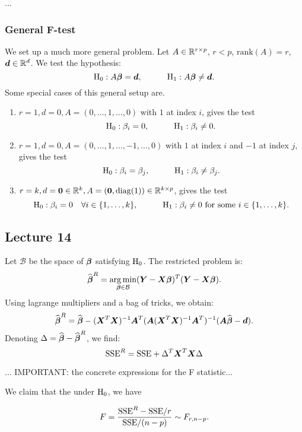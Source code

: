 


... \TODO

\subsubsection*{General F-test}


We set up a much more general problem. Let $A\in\mathbb{R}^{r\times p}$, $r<p$, $\mathrm{rank}(A)=r$, $\boldsymbol{d}\in\mathbb{R}^d$. We test the hypothesis:
$$
    \mathrm{H}_0 : A\boldsymbol{\beta} = \boldsymbol{d}, 
    \quad\quad\quad
    \mathrm{H}_1 : A\boldsymbol{\beta} \ne \boldsymbol{d}.
$$
Some special cases of this general setup are.
\begin{enumerate}
    \item $r=1, d=0, A=(0, \dots, 1, \dots, 0)$ with $1$ at index $i$, gives the test 
    $$
        \mathrm{H}_0 : \beta_i = 0, 
        \quad\quad\quad
        \mathrm{H}_1 : \beta_i \ne 0.
    $$
    \item $r=1, d=0, A=(0, \dots, 1, \dots, -1, \dots, 0)$ with $1$ at index $i$ and $-1$ at index $j$, gives the test 
    $$
        \mathrm{H}_0 : \beta_i = \beta_j,
        \quad\quad\quad
        \mathrm{H}_1 : \beta_i \ne \beta_j.
    $$
    \item $r=k, d=\boldsymbol{0}\in\mathbb{R}^k, A=(\boldsymbol{0}, \mathrm{diag}(1))\in\mathbb{R}^{k\times p}$, gives the test 
    $$
        \mathrm{H}_0 : \beta_i = 0 \quad\forall i\in\{1,\dots,k\},
        \quad\quad\quad
        \mathrm{H}_1 : \beta_i \ne 0 \textrm{ for some } i\in\{1,\dots,k\}.
    $$
\end{enumerate}

\subsection*{Lecture 14}

Let $\mathcal{B}$ be the space of $\boldsymbol{\beta}$ satisfying $\mathrm{H}_0$. The restricted problem is:
$$
    \widehat{\boldsymbol{\beta}}^R = \operatorname*{arg\,min}_{\boldsymbol{\beta}\in\mathcal{B}}(\boldsymbol{Y}-\boldsymbol{X}\boldsymbol{\beta})^T(\boldsymbol{Y}-\boldsymbol{X}\boldsymbol{\beta}).
$$
Using lagrange multipliers and a bag of tricks, we obtain:
$$
    \widehat{\boldsymbol{\beta}}^R = \widehat{\boldsymbol{\beta}} - (\boldsymbol{X}^T\boldsymbol{X})^{-1}\boldsymbol{A}^T(\boldsymbol{A}(\boldsymbol{X}^T\boldsymbol{X})^{-1}\boldsymbol{A}^T)^{-1}(\boldsymbol{A}\widehat{\boldsymbol{\beta}}-\boldsymbol{d}).
$$
Denoting $\Delta = \widehat{\boldsymbol{\beta}}-\widehat{\boldsymbol{\beta}}^R$, we find:
$$
    \mathrm{SSE}^R = \mathrm{SSE} + \Delta^T\boldsymbol{X}^T\boldsymbol{X}\Delta
$$

... IMPORTANT: the concrete expressions for the F statistic...

We claim that the under $\mathrm{H}_0$, we have

$$
    F = \frac{\mathrm{SSE}^R-\mathrm{SSE} / r}{\mathrm{SSE}/(n-p)} \sim F_{r, n-p}.
$$

